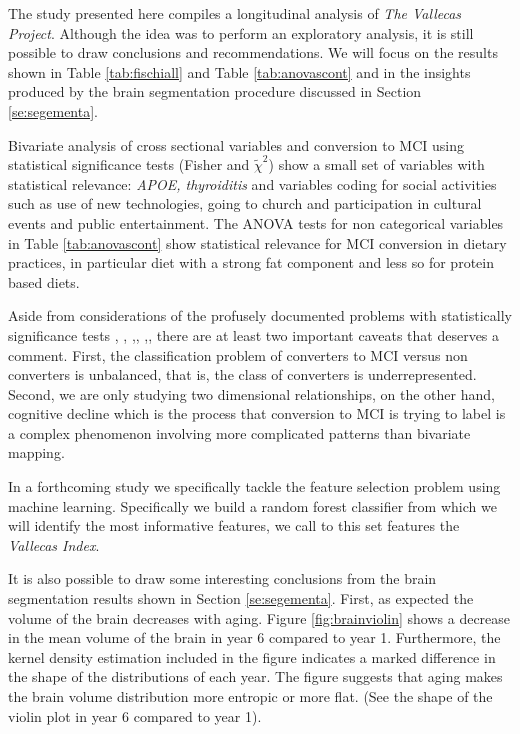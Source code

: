 \documentclass[11pt]{article}
\theoremstyle{definition}
\theoremstyle{remark}
\begin{document}

The study presented here compiles a longitudinal analysis of \emph{The Vallecas Project}. Although the idea was to perform an exploratory analysis, it is still possible to draw conclusions and recommendations.
We will focus on the results shown in Table \ref{tab:fischiall} and Table \ref{tab:anovascont} and in the insights produced by the brain segmentation procedure discussed in Section \ref{se:segementa}.

Bivariate analysis of cross sectional variables and conversion to MCI using statistical significance tests (Fisher and $\tilde{\chi}^2$) show a small set of variables with statistical relevance: \emph{APOE, thyroiditis} and variables coding for social activities such as use of new technologies, going to church and participation in cultural events and public entertainment.
The ANOVA tests for non categorical variables in Table \ref{tab:anovascont} show statistical relevance for MCI conversion in dietary practices, in particular diet with a strong fat component and less so for protein based diets.

Aside from considerations of the profusely documented problems with statistically significance tests \cite{ioannidis2005most}, \cite{simmons2011false}, \cite{veresoglou2015p},\cite{greenland2016statistical},
\cite{stupple2019reproducibility},\cite{hurlbert2019coup}, there are at least two important caveats that deserves a comment. First, the classification problem of converters to MCI versus non converters is unbalanced, that is, the class of converters is underrepresented. Second, we are only studying two dimensional relationships, on the other hand, cognitive decline which is the process that conversion to MCI is trying to label is a complex phenomenon involving more complicated patterns than bivariate mapping. 

In a forthcoming study we specifically tackle the feature selection problem using machine learning. Specifically we build a random forest classifier \cite{breiman2001random} from which we will identify the most informative features, we call to this set features the \emph{Vallecas Index}.

It is also possible to draw some interesting conclusions from the brain segmentation results shown in Section \ref{se:segementa}. First, as expected the volume of the brain decreases with aging. Figure \ref{fig:brainviolin} shows a decrease in the mean volume of the brain in year 6 compared to year 1. Furthermore, the kernel density estimation included in the figure indicates a marked difference in the shape of the distributions of each year. The figure suggests that aging makes the brain volume distribution more entropic or more flat. (See the shape of the violin plot in year 6 compared to year 1).
\end{document}
